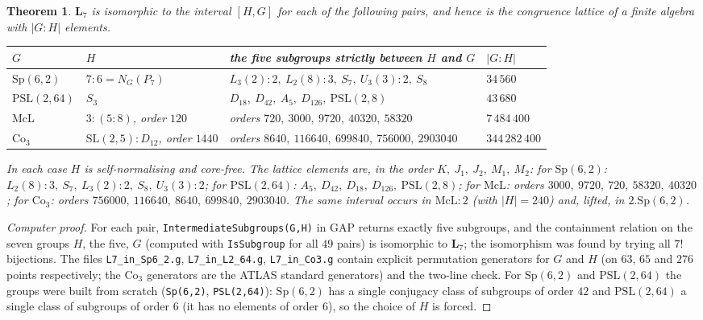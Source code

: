 \documentclass[11pt]{article}
\newtheorem{theorem}{Theorem}
\theoremstyle{remark}
\newcommand{\LL}{\mathbf{L}_7}
\begin{document}
\begin{theorem}\label{thm:rep}
$\LL$ is isomorphic to the interval $[H,G]$ for each of the following pairs, and hence is the
congruence lattice of a finite algebra with $|G:H|$ elements.
\begin{center}
\begin{tabular}{llll}
\toprule
$G$ & $H$ & the five subgroups strictly between $H$ and $G$ & $|G:H|$\\
\midrule
$\mathrm{Sp}(6,2)$ & $7{:}6=N_G(P_7)$ & $L_3(2){:}2,\ L_2(8){:}3,\ S_7,\ U_3(3){:}2,\ S_8$ & $34\,560$\\
$\mathrm{PSL}(2,64)$ & $S_3$ & $D_{18},\ D_{42},\ A_5,\ D_{126},\ \mathrm{PSL}(2,8)$ & $43\,680$\\
$\mathrm{McL}$ & $3{:}(5{:}8)$, order $120$ & orders $720,\ 3000,\ 9720,\ 40320,\ 58320$ & $7\,484\,400$\\
$\mathrm{Co}_3$ & $\mathrm{SL}(2,5){:}D_{12}$, order $1440$ & orders $8640,\ 116640,\ 699840,\ 756000,\ 2903040$ & $344\,282\,400$\\
\bottomrule
\end{tabular}
\end{center}
In each case $H$ is self-normalising and core-free. The lattice elements are, in the order
$K,\ J_1,\ J_2,\ M_1,\ M_2$:
for $\mathrm{Sp}(6,2)$: $L_2(8){:}3,\ S_7,\ L_3(2){:}2,\ S_8,\ U_3(3){:}2$;
for $\mathrm{PSL}(2,64)$: $A_5,\ D_{42},\ D_{18},\ D_{126},\ \mathrm{PSL}(2,8)$;
for $\mathrm{McL}$: orders $3000,\ 9720,\ 720,\ 58320,\ 40320$;
for $\mathrm{Co}_3$: orders $756000,\ 116640,\ 8640,\ 699840,\ 2903040$.
The same interval occurs in $\mathrm{McL}{:}2$ (with $|H|=240$) and, lifted, in $2.\mathrm{Sp}(6,2)$.
\end{theorem}

\begin{proof}[Computer proof]
For each pair, \texttt{IntermediateSubgroups(G,H)} in GAP returns exactly five subgroups, and
the containment relation on the seven groups $H$, the five, $G$ (computed with
\texttt{IsSubgroup} for all $49$ pairs) is isomorphic to $\LL$; the isomorphism was found by
trying all $7!$ bijections. The files \texttt{L7\_in\_Sp6\_2.g}, \texttt{L7\_in\_L2\_64.g},
\texttt{L7\_in\_Co3.g} contain explicit permutation generators for $G$ and $H$ (on $63$, $65$
and $276$ points respectively; the $\mathrm{Co}_3$ generators are the ATLAS standard
generators) and the two-line check. For $\mathrm{Sp}(6,2)$ and $\mathrm{PSL}(2,64)$ the groups
were built from scratch (\texttt{Sp(6,2)}, \texttt{PSL(2,64)}): $\mathrm{Sp}(6,2)$ has a single
conjugacy class of subgroups of order $42$ and $\mathrm{PSL}(2,64)$ a single class of subgroups
of order $6$ (it has no elements of order $6$), so the choice of $H$ is forced.
\end{proof}
\end{document}
